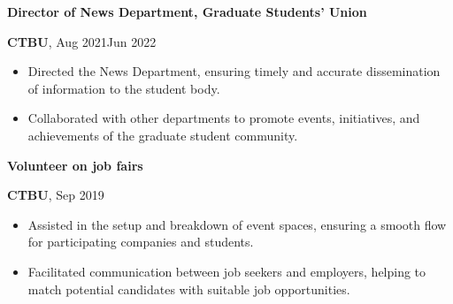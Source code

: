 \documentclass[a4paper,20pt]{article}
\begin{document}
\begin{minipage}{.6\linewidth} \begin{flushleft}
\textbf{Director of News Department, Graduate Students' Union}
    \end{flushleft} \end{minipage}
    \hfill
    \begin{minipage}{.3\linewidth}\begin{flushright}
    	\textbf{CTBU}, Aug 2021\textemdash Jun 2022
    \end{flushright}\end{minipage}
    \begin{itemize}
    \centering
    \justifying
	\item{Directed the News Department, ensuring timely and accurate dissemination of information to the student body.}
    \vspace{-5pt}
   	\item{Collaborated with other departments to promote events, initiatives, and achievements of the graduate student community.}
    \end{itemize}

\begin{minipage}{.4\linewidth} \begin{flushleft}
\textbf{Volunteer on job fairs}
    \end{flushleft} \end{minipage}
    \hfill
    \begin{minipage}{.5\linewidth}\begin{flushright}
    	\textbf{CTBU}, Sep 2019
    \end{flushright}\end{minipage}
    \begin{itemize}
    \centering
    \justifying
	\item{Assisted in the setup and breakdown of event spaces, ensuring a smooth flow for participating companies and students.}
    \vspace{-5pt}
   	\item{Facilitated communication between job seekers and employers, helping to match potential candidates with suitable job opportunities.}
    \end{itemize}
\end{document}
